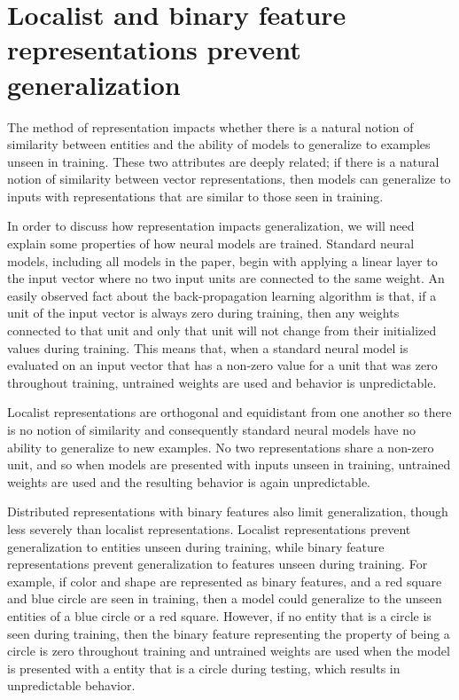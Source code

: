 \documentclass{article}
\begin{document}
\section{Localist and binary feature representations prevent generalization}\label{app:generalization}

The method of representation impacts whether there is a natural notion of similarity between entities and the ability of models to generalize to examples unseen in training. These two attributes are deeply related; if there is a natural notion of similarity between vector representations, then models can generalize to inputs with representations that are similar to those seen in training.

In order to discuss how representation impacts generalization, we will need explain some properties of how neural models are trained. Standard neural models, including all models in the paper, begin with applying a linear layer to the input vector where no two input units are connected to the same weight. An easily observed fact about the back-propagation learning algorithm is that, if a unit of the input vector is always zero during training, then any weights connected to that unit and only that unit will not change from their initialized values during training. This means that, when a standard neural model is evaluated on an input vector that has a non-zero value for a unit that was zero throughout training, untrained weights are used and behavior is unpredictable.

Localist representations are orthogonal and equidistant from one another so there is no notion of similarity and consequently standard neural models have no ability to generalize to new examples. No two representations share a non-zero unit, and so when models are presented with inputs unseen in training, untrained weights are used and the resulting behavior is again unpredictable.

Distributed representations with binary features also limit generalization, though less severely than localist representations. Localist representations prevent generalization to entities unseen during training, while binary feature representations prevent generalization to features unseen during training. For example, if color and shape are represented as binary features, and a red square and blue circle are seen in training, then a model could generalize to the unseen entities of a blue circle or a red square. However, if no entity that is a circle is seen during training, then the binary feature representing the property of being a circle is zero throughout training and untrained weights are used when the model is presented with a entity that is a circle during testing, which results in unpredictable behavior.
\end{document}
